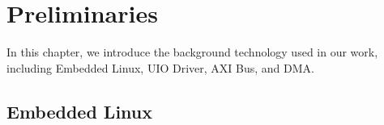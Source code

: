 \chapter{Preliminaries}
\label{cha:Preliminaries}
In this chapter, we introduce the background technology used in our work, including Embedded Linux, UIO Driver, AXI Bus, and DMA.



\section{Embedded Linux}
\label{sec:Embedded Linux}

